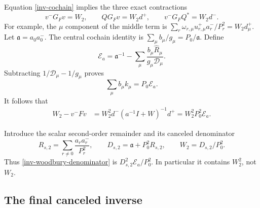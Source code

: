 \documentclass[11pt]{article}
\theoremstyle{remark}
\begin{document}
Equation \eqref{inv-cochain} implies the three exact contractions
\begin{equation}\label{inv-three-contractions}
 v^-G_Fv=W_2,\qquad QG_Fv=W_2d^+,
 \qquad v^-G_FQ^*=W_2d^-.
\end{equation}
For example, the $\mu$ component of the middle term is
$\sum_r\omega_{r,\mu}u_{r,\mu}^+a_r^-/P_r^2=W_2d_\mu^+$.
Let $\mathfrak a=a_0a_0^-$. The central cochain identity is
$\sum_\mu b_\mu/g_\mu=P_0/\mathfrak a$. Define
\begin{equation}\label{inv-Ea}
 \mathcal E_a=\mathfrak a^{-1}
 -\sum_\mu\frac{b_\mu\widehat R_\mu}{g_\mu\mathcal D_\mu}.
\end{equation}
Subtracting $1/\mathcal D_\mu-1/g_\mu$ proves
\begin{equation}\label{inv-Ea-identity}
 \sum_\mu b_\mu k_\mu=P_0\mathcal E_a.
\end{equation}
It follows that
\begin{align}
 W_2-v^-Fv
 &=W_2^2d^-(a^{-1}I+W)^{-1}d^+
  =W_2^2P_0^2\mathcal E_a.
 \label{inv-woodbury-denominator}
\end{align}

Introduce the scalar second-order remainder and its canceled denominator
\begin{equation}\label{inv-Ds2}
 R_{s,2}=\sum_{r\ne0}\frac{a_ra_r^-}{P_r^2},\qquad
 D_{s,2}=\mathfrak a+P_0^2R_{s,2},\qquad
 W_2=D_{s,2}/P_0^2.
\end{equation}
Thus \eqref{inv-woodbury-denominator} is
$D_{s,2}^2\mathcal E_a/P_0^2$. In particular it contains $W_2^2$,
not $W_2$.

\subsection{The final canceled inverse}
\end{document}
